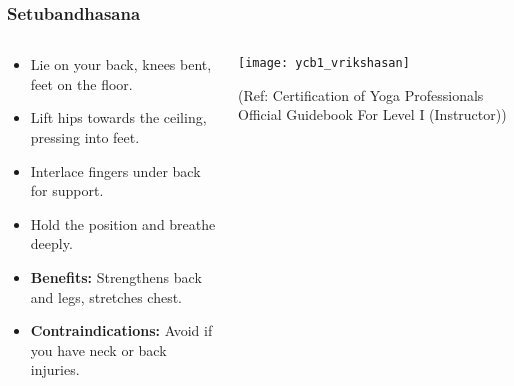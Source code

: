 \begin{frame}[fragile]\frametitle{Setubandhasana}
\begin{columns}
    \begin{column}[T]{0.5\linewidth}
      \begin{itemize}
        \item Lie on your back, knees bent, feet on the floor.
        \item Lift hips towards the ceiling, pressing into feet.
        \item Interlace fingers under back for support.
        \item Hold the position and breathe deeply.
        \item \textbf{Benefits:} Strengthens back and legs, stretches chest.
        \item \textbf{Contraindications:} Avoid if you have neck or back injuries.
      \end{itemize}
    \end{column}
    \begin{column}[T]{0.5\linewidth}
        \begin{center}
        \begin{center}
		        \texttt{[image: ycb1\_vrikshasan]}
				
				{\tiny (Ref: Certification  of Yoga Professionals Official Guidebook For Level I (Instructor))}	        
		\end{center}   
        \end{center}    
    \end{column}
  \end{columns}
\end{frame}


